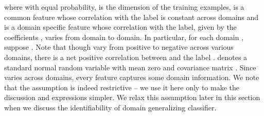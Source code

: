\documentclass{article}
\begin{document}
where  with equal probability,  is the dimension of the training examples,  is a common feature whose correlation with the label is constant across domains and  is a domain specific feature whose correlation with the label, given by the coefficients , varies from domain to domain.
In particular, for each domain , suppose . Note that though  vary from positive to negative across various domains, there is a net positive correlation between  and the label .  denotes a  standard normal random variable with mean zero and covariance matrix . Since  varies across domains, every feature  
captures some domain information. {We note that the assumption  is indeed restrictive -- we use it here only to make the discussion and expressions simpler. We relax this assumption later in this section when we discuss the identifiability of domain generalizing classifier.}
\end{document}
